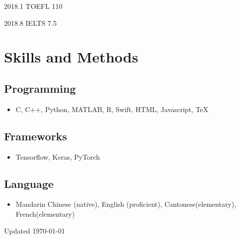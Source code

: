 \documentclass{academiccv}
\begin{document}
\begin{tablist}
	\item[2018.1] \tab TOEFL 110
	\item[2018.8] \tab IELTS 7.5
	\end{tablist}


\section*{Skills and Methods}

\subsection*{Programming}
\begin{itemize}
	\item C, C++, Python, MATLAB, R, Swift, HTML, Javascript, \TeX{}
\end{itemize}

\subsection*{Frameworks}
\begin{itemize}
	\item Tensorflow, Keras, PyTorch
\end{itemize}

\subsection*{Language}

\begin{itemize}
	\item  Mandarin Chinese (native), English (proficient), Cantonese(elementary), French(elementary)
\end{itemize}



\begin{center}
\vspace{6em}
Updated \monthyeardate\today
\end{center}
\end{document}
